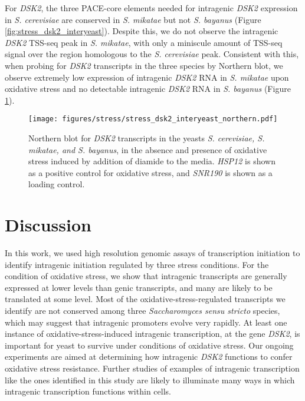 For \textit{DSK2}, the three PACE-core elements needed for intragenic \textit{DSK2} expression in \textit{S. cerevisiae} are conserved in \textit{S. mikatae} but not \textit{S. bayanus} (Figure \ref{fig:stress_dsk2_interyeast}).
Despite this, we do not observe the intragenic \textit{DSK2} TSS-seq peak in \textit{S. mikatae}, with only a miniscule amount of TSS-seq signal over the region homologous to the \textit{S. cerevisiae} peak.
Consistent with this, when probing for \textit{DSK2} transcripts in the three species by Northern blot, we observe extremely low expression of intragenic \textit{DSK2} RNA in \textit{S. mikatae} upon oxidative stress and no detectable intragenic \textit{DSK2} RNA in \textit{S. bayanus} (Figure \ref{fig:stress_dsk2_interyeast_northern}).

\begin{figure}[h]
    \centering
    \texttt{[image: figures/stress/stress\_dsk2\_interyeast\_northern.pdf]}
    \caption[Northern blot for \textit{DSK2} transcripts in the yeasts \textit{S. cerevisiae, S. mikatae, and S. bayanus}, in the absence and presence of oxidative stress.]{Northern blot for \textit{DSK2} transcripts in the yeasts \textit{S. cerevisiae, S. mikatae, and S. bayanus}, in the absence and presence of oxidative stress induced by addition of diamide to the media. \textit{HSP12} is shown as a positive control for oxidative stress, and \textit{SNR190} is shown as a loading control.}
    \label{fig:stress_dsk2_interyeast_northern}
\end{figure}

\section{Discussion}

In this work, we used high resolution genomic assays of transcription initiation to identify intragenic initiation regulated by three stress conditions.
For the condition of oxidative stress, we show that intragenic transcripts are generally expressed at lower levels than genic transcripts, and many are likely to be translated at some level.
Most of the oxidative-stress-regulated transcripts we identify are not conserved among three \textit{Saccharomyces sensu stricto} species, which may suggest that intragenic promoters evolve very rapidly.
At least one instance of oxidative-stress-induced intragenic transcription, at the gene \textit{DSK2}, is important for yeast to survive under conditions of oxidative stress.
Our ongoing experiments are aimed at determining how intragenic \textit{DSK2} functions to confer oxidative stress resistance.
Further studies of examples of intragenic transcription like the ones identified in this study are likely to illuminate many ways in which intragenic transcription functions within cells.

